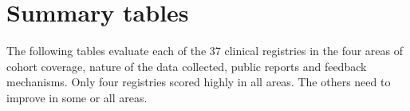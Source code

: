 \documentclass[FrontPage]{grattan}
\begin{document}
\section{Summary tables}
The following tables evaluate each of the 37 clinical registries in the four areas of cohort coverage, nature of the data collected, public reports and feedback mechanisms. Only four registries scored highly in all areas. The others need to improve in some or all areas.










 








\end{document}
